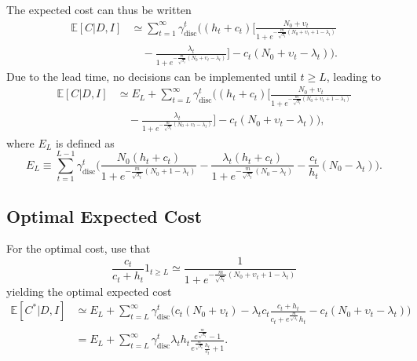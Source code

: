 The expected cost can thus be written
\begin{equation}
	\begin{split}
		\mathbb{E}[C|D,I] &\simeq \sum_{t=1}^{\infty} \gamma_{\text{disc}}^{t} \bigg( 
		(h_t+c_t)\bigg[\frac{N_0 + \upsilon_t}{1+e^{-\frac{m}{\sqrt{\lambda_t}}(N_0+\upsilon_t+1-\lambda_t)}}\\
		&\quad- \frac{\lambda_t}{1+e^{-\frac{m}{\sqrt{\lambda_t}}(N_0+\upsilon_t-\lambda_t)}}\bigg] - c_t(N_0 + \upsilon_t-\lambda_t)\bigg).
	\end{split}
\end{equation}
Due to the lead time, no decisions can be implemented until $t \geq L$, leading to
\begin{equation}
	\begin{split}
		\mathbb{E}[C|D,I] &\simeq E_L+\sum_{t=L}^{\infty} \gamma_{\text{disc}}^{t} \bigg( 
		(h_t+c_t)\bigg[\frac{N_0 + \upsilon_t}{1+e^{-\frac{m}{\sqrt{\lambda_t}}(N_0+\upsilon_t+1-\lambda_t)}}\\
		&\quad- \frac{\lambda_t}{1+e^{-\frac{m}{\sqrt{\lambda_t}}(N_0+\upsilon_t-\lambda_t)}}\bigg] - c_t(N_0 + \upsilon_t-\lambda_t)\bigg),
	\end{split}
\end{equation}
where $E_L$ is defined as
\begin{equation}
	E_L \equiv \sum_{t=1}^{L-1} \gamma_{\text{disc}}^{t} \bigg( 
	\frac{N_0(h_t+c_t)}{1+e^{-\frac{m}{\sqrt{\lambda_t}}(N_0+1-\lambda_t)}} - \frac{\lambda_t(h_t+c_t)}{1+e^{-\frac{m}{\sqrt{\lambda_t}}(N_0-\lambda_t)}} - \frac{c_t}{h_t}(N_0-\lambda_t)\bigg).
\end{equation}

\subsection{Optimal Expected Cost}
For the optimal cost, use that
\begin{equation}
	\frac{c_t}{c_t+h_t}1_{t\geq L}\simeq\frac{1}{1+e^{-\frac{m}{\sqrt{\lambda_t}}(N_0+\upsilon_t+1-\lambda_t)}}
\end{equation}
yielding the optimal expected cost
\begin{equation}
	\begin{split}
		\mathbb{E}[C^*|D,I] &\simeq E_L+ \sum_{t=L}^{\infty} \gamma_{\text{disc}}^{t} \bigg( 
		c_t(N_0 + \upsilon_t)- \lambda_tc_t\frac{c_t+h_t}{c_t+e^{\frac{m}{\sqrt{\lambda_t}}}h_t}- c_t(N_0 + \upsilon_t-\lambda_t)\bigg)\\
		&= E_L+\sum_{t=L}^{\infty} \gamma_{\text{disc}}^{t} \lambda_th_t\frac{e^{\frac{m}{\sqrt{\lambda_t}}}-1}{e^{\frac{m}{\sqrt{\lambda_t}}}\frac{h_t}{c_t}+1}.\\
	\end{split}
\end{equation}

